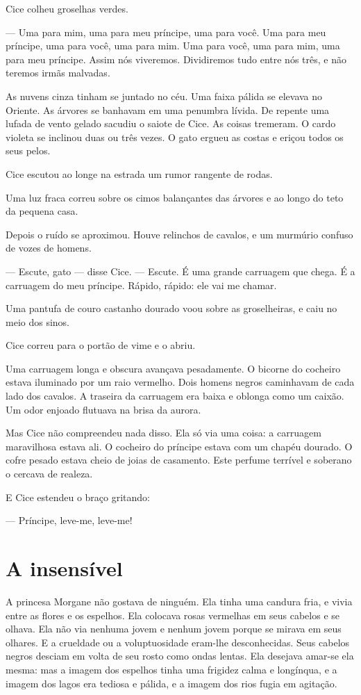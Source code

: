 Cice colheu groselhas verdes.

--- Uma para mim, uma para meu príncipe, uma para você. Uma para meu
príncipe, uma para você, uma para mim. Uma para você, uma para mim, uma
para meu príncipe. Assim nós viveremos. Dividiremos tudo entre nós três, e
não teremos irmãs malvadas.


As nuvens cinza tinham se juntado no céu. Uma faixa pálida se elevava
no Oriente. As árvores se banhavam em uma penumbra lívida. De repente uma
lufada de vento gelado sacudiu o saiote de Cice. As coisas tremeram. O
cardo violeta se inclinou duas ou três vezes. O gato ergueu as costas e
eriçou todos os seus pelos.

Cice escutou ao longe na estrada um rumor rangente de rodas.

Uma luz fraca correu sobre os cimos balançantes das árvores e ao longo
do teto da pequena casa.

Depois o ruído se aproximou. Houve relinchos de cavalos, e um murmúrio
confuso de vozes de homens.

--- Escute, gato --- disse Cice.  --- Escute. É uma grande carruagem que chega.
É a carruagem do meu príncipe. Rápido, rápido: ele vai me chamar.

Uma pantufa de couro castanho dourado voou sobre as groselheiras, e
caiu no meio dos sinos.

Cice correu para o portão de vime e o abriu.

Uma carruagem longa e obscura avançava pesadamente. O bicorne do
cocheiro estava iluminado por um raio vermelho. Dois homens negros caminhavam
de cada lado dos cavalos. A traseira da carruagem era baixa e oblonga como
um caixão. Um odor enjoado flutuava na brisa da aurora.

Mas Cice não compreendeu nada disso. Ela só via uma coisa: a carruagem
maravilhosa estava ali. O cocheiro do príncipe estava com um chapéu
dourado. O cofre pesado estava cheio de joias de casamento. Este perfume
terrível e soberano o cercava de realeza.

E Cice estendeu o braço gritando:

--- Príncipe, leve-me, leve-me!

\section{A insensível}

A princesa Morgane não gostava de ninguém. Ela tinha uma candura fria,
e vivia entre as flores e os espelhos. Ela colocava rosas vermelhas em
seus cabelos e se olhava. Ela não via nenhuma jovem e nenhum jovem porque
se mirava em seus olhares. E a crueldade ou a voluptuosidade eram-lhe
desconhecidas. Seus cabelos negros desciam em volta de seu rosto como
ondas lentas. Ela desejava amar-se ela mesma: mas a imagem dos espelhos
tinha uma frigidez calma e longínqua, e a imagem dos lagos era tediosa e
pálida, e a imagem dos rios fugia em agitação.

